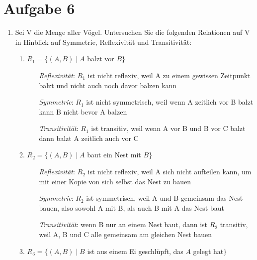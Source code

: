 \documentclass{alex_hü}
\begin{document}
	\renewcommand{\labelenumi}{\Alph{enumi})}
	
	
	\section*{Aufgabe 6}
	\begin{enumerate}
		\item  Sei V die Menge aller Vögel. Untersuchen Sie die folgenden Relationen auf V
		in Hinblick auf Symmetrie, Reflexivität und Transitivität:
			\begin{enumerate}
				\item $R_{1} = \{(A, B) \mid A$ balzt vor $B\}$ \\
				\begin{itemize}[leftmargin=2.5cm,labelsep=0.25cm]
					\item[\textit{Reflexivität}:] $R_{1}$ ist nicht reflexiv, weil A zu einem gewissen Zeitpunkt balzt und nicht auch noch davor balzen kann\\
					\item[\textit{Symmetrie}:] $R_{1}$ ist nicht symmetrisch, weil wenn A zeitlich vor B balzt kann B nicht bevor A balzen\\
					\item[\textit{Transitivität}:] $R_{1}$ ist transitiv, weil wenn A vor B und B vor C balzt dann balzt A zeitlich auch vor C\\
				\end{itemize}
				\item $R_{2} = \{(A, B) \mid A$ baut ein Nest mit $B\}$ \\
				\begin{itemize}[leftmargin=2.5cm,labelsep=0.25cm]
					\item[\textit{Reflexivität}:] $R_{2}$ ist nicht reflexiv, weil A sich nicht aufteilen kann, um mit einer Kopie von sich selbst das Nest zu bauen \\
					\item[\textit{Symmetrie}:] $R_{2}$ ist symmetrisch, weil A und B gemeinsam das Nest bauen, also sowohl A mit B, als auch B mit A das Nest baut\\
					\item[\textit{Transitivität}:] wenn B nur an einem Nest baut, dann ist $R_{2}$ transitiv, weil A, B und C alle gemeinsam am gleichen Nest bauen\\
				\end{itemize}
				\item $R_{3} = \{(A, B) \mid B$ ist aus einem Ei geschlüpft, das $A$ gelegt hat$\}$ \\

\end{enumerate}
\end{enumerate}
\end{document}
